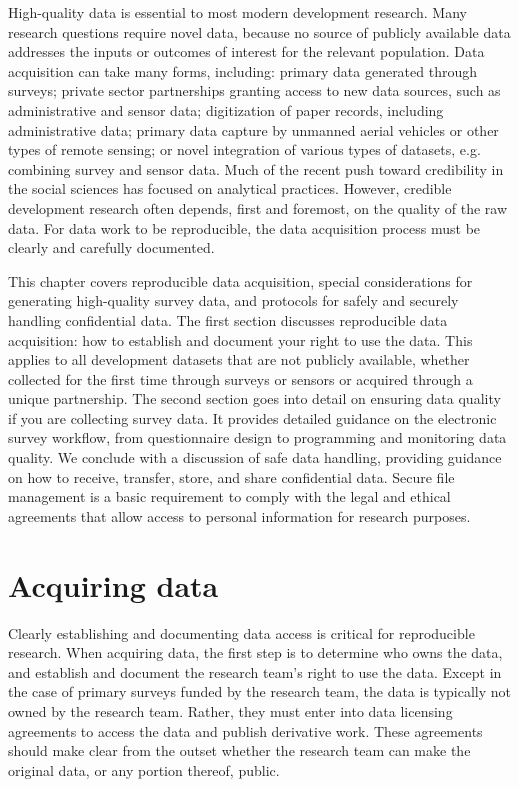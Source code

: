 
\begin{fullwidth}
High-quality data is essential to most modern development research.
Many research questions require novel data, 
because no source of publicly available data addresses the 
inputs or outcomes of interest for the relevant population.
Data acquisition can take many forms, including: 
primary data generated through surveys; 
private sector partnerships granting access to new data sources, such as administrative and sensor data;
digitization of paper records, including administrative data;
primary data capture by unmanned aerial vehicles or other types of remote sensing;
or novel integration of various types of datasets, e.g. combining survey and sensor data.
Much of the recent push toward credibility in the social sciences has focused on analytical practices.
However, credible development research often depends, first and foremost, on the quality of the raw data.
For data work to be reproducible, the data acquisition process must be clearly and carefully documented.

This chapter covers reproducible data acquisition,
special considerations for generating high-quality survey data, 
and protocols for safely and securely handling confidential data. 
The first section discusses reproducible data acquisition:
how to establish and document your right to use the data.
This applies to all development datasets that are not publicly available, 
whether collected for the first time through surveys or sensors or acquired through a unique partnership.
The second section goes into detail on ensuring data quality if you are collecting survey data.
It provides detailed guidance on the electronic survey workflow,
from questionnaire design to programming and monitoring data quality.
We conclude with a discussion of safe data handling, 
providing guidance on how to receive, transfer, store, and share confidential data.
Secure file management is a basic requirement to comply with the legal and 
ethical agreements that allow  access to personal information for research purposes.


\end{fullwidth}

\section{Acquiring data}
Clearly establishing and documenting data access is critical for reproducible research.  
When acquiring data, the first step is to determine who owns the data, 
and establish and document the research team's right to use the data. 
Except in the case of primary surveys funded by the research team, 
the data is typically not owned by the research team. 
Rather, they must enter into data licensing agreements 
to access the data and publish derivative work. 
These agreements should make clear from the outset whether the 
research team can make the original data, or any portion thereof, public. 


